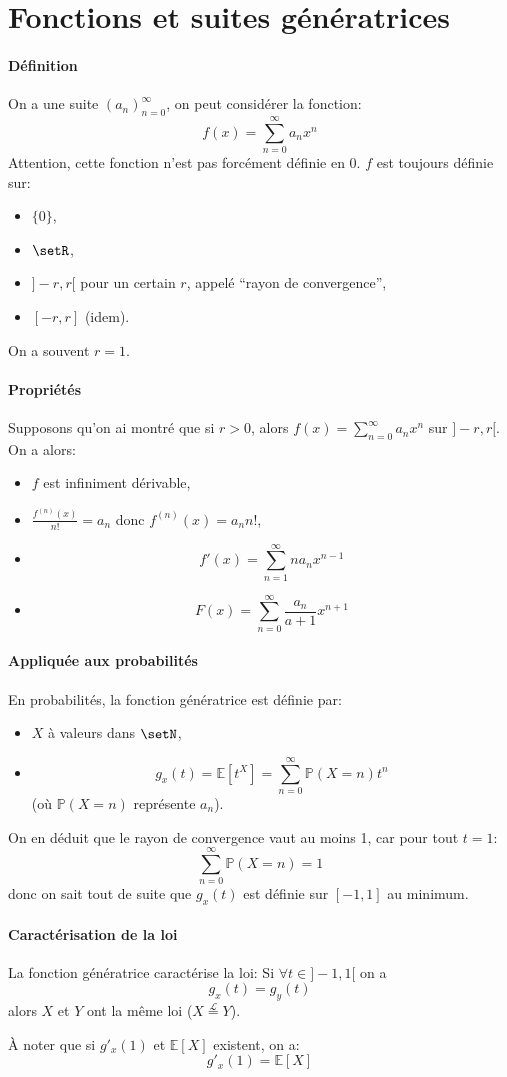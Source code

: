 \documentclass[a4paper,10pt,french,openany]{memoir}
\newcommand{\Proba}{\mathbb{P}}
\newcommand{\Esper}{\mathbb{E}}
\newcommand{\laweq}{\overset{\mathcal L}=}
\begin{document}
\section{Fonctions et suites génératrices}

\paragraph{Définition}
On a une suite $(a_n)_{n=0}^\infty$, on peut considérer la fonction:
\[f(x) = \sum_{n=0}^\infty a_n x^n\]
Attention, cette fonction n'est pas forcément définie en 0. $f$ est toujours définie sur:
\begin{itemize}
 \item $\lbrace 0 \rbrace$,
 \item $\setR$,
 \item $] -r, r [$ pour un certain $r$, appelé ``rayon de convergence'',
 \item $[ -r, r ]$ (idem).
\end{itemize}
On a souvent $r=1$.

\paragraph{Propriétés}
Supposons qu'on ai montré que si $r>0$, alors $f(x)=\sum_{n=0}^\infty a_n x^n$ sur $]-r,r[$. On a alors:
\begin{itemize}
 \item $f$ est infiniment dérivable,
 \item $\frac{f^{(n)} (x)}{n!} = a_n$ donc $f^{(n)}(x) = a_n n!$,
 \item \[f'(x) = \sum_{n=1}^\infty n a_n x^{n-1}\]
 \item \[F(x) = \sum_{n=0}^\infty \frac{a_n}{a+1} x^{n+1}\]
\end{itemize}

\paragraph{Appliquée aux probabilités}
En probabilités, la fonction génératrice est définie par:
\begin{itemize}
 \item $X$ à valeurs dans $\setN$,
 \item \[g_x (t) = \Esper[t^X] = \sum_{n=0}^\infty \Proba(X=n) t^n\] (où $\Proba(X=n)$ représente $a_n$).
\end{itemize}
On en déduit que le rayon de convergence vaut au moins 1, car pour tout $t=1$: \[\sum_{n=0}^\infty \Proba(X=n)=1\] donc on sait tout de suite que $g_x (t)$ est définie sur $[-1,1]$ au minimum.

\paragraph{Caractérisation de la loi}
La fonction génératrice caractérise la loi:
Si $\forall t \in ]-1,1[$ on a \[g_x(t) = g_y(t)\] alors $X$ et $Y$ ont la même loi ($X \laweq Y$).

À noter que si $g'_x(1)$ et $\Esper[X]$ existent, on a: \[g'_x(1) = \Esper[X]\]
\end{document}
